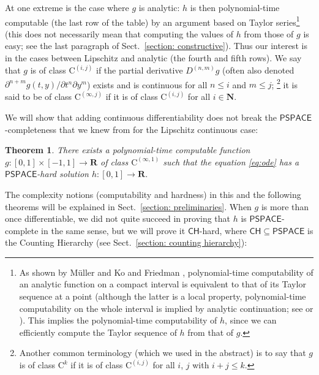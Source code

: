\documentclass[12pt,a4paper]{article}
\newtheorem{theorem}{Theorem}%
\theoremstyle{definition}
\theoremstyle{remark}
\newcommand{\R}{\mathbf R}
\newcommand{\N}{\mathbf N}
\newcommand{\D}{D}
\newcommand{\classPSPACE}{\mathsf{PSPACE}}
\newcommand{\classCH}{\mathsf{CH}}
\newcommand{\classC}{\mathrm C}
\begin{document}
At one extreme is the case where $g$ is analytic: 
$h$ is then polynomial-time computable 
(the last row of the table) 
by an argument based on Taylor series\footnote{
As shown by M\"uller \cite{muller1987uniform} and 
Ko and Friedman \cite{ko1988computing}, 
polynomial-time computability of an analytic function 
on a compact interval is 
equivalent to that of its Taylor sequence at a point 
(although the latter is a local property, 
polynomial-time computability on the whole interval is implied 
by analytic continuation; 
see \cite[Corollary~4.5]{muller1987uniform}
or \cite[Theorem~11]{kawamura2010complexity}). 
This implies the polynomial-time computability of $h$, 
since we can efficiently compute the 
Taylor sequence of $h$ from that of $g$. 
} (this does not necessarily mean that 
computing the values of $h$ from those of $g$ is easy; 
see the last paragraph of Sect.~\ref{section: constructive}). 
Thus our interest is in 
the cases between Lipschitz and analytic 
(the fourth and fifth rows). 
We say that $g$ is of class $\classC ^{(i, j)}$
if the partial derivative $\D ^{(n, m)} g$ 
(often also denoted $\partial ^{n + m} g (t, y) / \partial t ^n \partial y ^m$)
exists and is continuous for all $n \le i$ and $m \le j$;%
\footnote{%
Another common terminology (which we used in the abstract)
is to say that $g$ is of class $\classC ^k$
if it is of class $\classC ^{(i,j)}$ 
for all $i$, $j$ with $i + j \leq k$.}
it is said to be of class $\classC ^{(\infty, j)}$ if
it is of class $\classC ^{(i, j)}$ for all $i \in \N$. 

We will show that adding continuous differentiability does not break the
$\classPSPACE$-completeness that we knew from \cite{kawamura2010lipschitz} 
for the Lipschitz continuous case: 

\begin{theorem}
 \label{DifferentiableIsPspace}
There exists a polynomial-time computable function
$g \colon [0,1] \times [-1,1] \to \R$ 
of class $\classC ^{(\infty, 1)}$ such that
the equation \eqref{eq:ode} has a 
$\classPSPACE$-hard solution $h \colon [0, 1] \to \R$. 
 \end{theorem}

The complexity notions (computability and hardness) in this and the following theorems 
will be explained in Sect.~\ref{section: preliminaries}. 
When $g$ is more than once differentiable, 
we did not quite succeed in proving that $h$ is $\classPSPACE$-complete
in the same sense, 
but we will prove it $\classCH$-hard, 
where $\classCH \subseteq \classPSPACE$ is the 
Counting Hierarchy (see Sect.~\ref{section: counting hierarchy}): 
\end{document}
